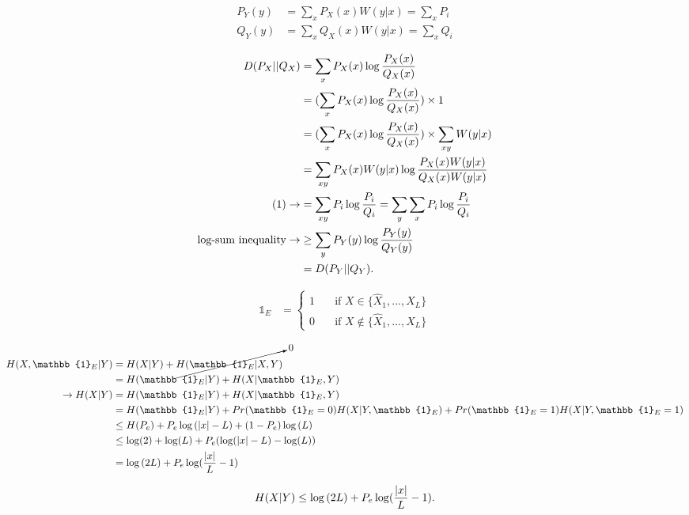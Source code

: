 \documentclass[
  course = {{EE623 Information Theory}},
  quartile = {{Fall 2020}},
  assignment = 2,
  name = {{Mohammad Mahdi Rahimi}},
  studentnumber = {{20208244}},
  email = {{mahi@kaist.ac.kr}},
  firstexercise = 1
]{aga-homework}
\begin{document}
\exercise

\begin{equation} \label{eq1}
\begin{split}
P_Y(y) & = \sum_x{P_X(x)W(y|x)} = \sum_x{P_i}\\
Q_Y(y) & = \sum_x{Q_X(x)W(y|x)} = \sum_x{Q_i}
\end{split}
\end{equation}

\begin{equation} \label{eq2}
\begin{split}
D(P_X || Q_X) & = \sum_x{P_X(x)\log{P_X(x) \over Q_X(x)}} \\
& = (\sum_x{P_X(x)\log{P_X(x) \over Q_X(x)}}) \times 1 \\
& = (\sum_x{P_X(x)\log{P_X(x) \over Q_X(x)}}) \times \sum_{xy}{W(y|x)} \\
& = \sum_{xy}{P_X(x)W(y|x)\log{P_X(x)W(y|x) \over Q_X(x) W(y|x)}} \\
(1) \rightarrow & = \sum_{xy}P_i\log{P_i \over Q_i}  = \sum_y\sum_{x}P_i\log{P_i \over Q_i}\\
\text{log-sum inequality} \rightarrow & \ge \sum_y{P_Y(y)\log{P_Y(y) \over Q_Y(y)}} \\
& = D(P_Y || Q_Y). 
\end{split}
\end{equation}

\exercise

\begin{equation} \label{eq3}
\begin{split}
\mathbb{1}_E & = 
\begin{cases}
    1 &\quad\text{if } X \in \{\hat{X}_1 , ..., \hat{X}_L\}\\
    0 &\quad\text{if } X \notin \{\hat{X}_1 , ..., \hat{X}_L\}
\end{cases}
\end{split}
\end{equation}

\begin{equation} \label{eq4}
\begin{split}
H(X,\mathbb{1}_E|Y) & = H(X|Y) + \cancelto{0}{H(\mathbb{1}_E | X,Y)} \\
& = H(\mathbb{1}_E | Y) + H(X | \mathbb{1}_E, Y) \\
\rightarrow H(X|Y) & = H(\mathbb{1}_E | Y) + H(X | \mathbb{1}_E, Y)\\
& = H(\mathbb{1}_E | Y) + Pr(\mathbb{1}_E = 0)H(X|Y, \mathbb{1}_E) + Pr(\mathbb{1}_E = 1)H(X|Y, \mathbb{1}_E = 1)\\
& \le H(P_e) + P_e \log{(|x| - L)} + (1 - P_e) \log{(L)} \\
& \le \log(2) + \log(L) + P_e(\log(|x| - L) - \log(L)) \\
& = \log{(2L)} + P_e\log({|x| \over L} - 1)
\end{split}
\end{equation}

\begin{equation} \label{eq5}
\begin{split}
H(X|Y) \le \log{(2L)} + P_e\log({|x| \over L} - 1).
\end{split}
\end{equation}
\end{document}
